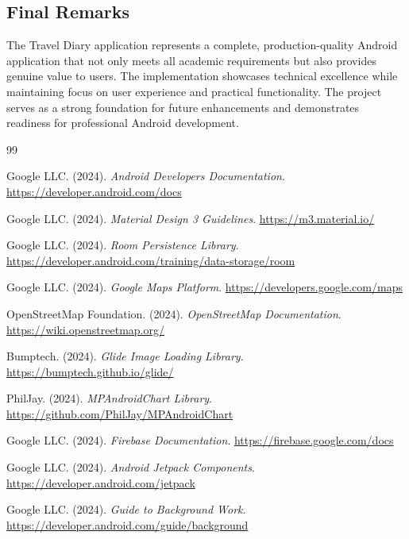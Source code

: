\documentclass[12pt,a4paper]{article}
\begin{document}
\subsection{Final Remarks}
The Travel Diary application represents a complete, production-quality Android application that not only meets all academic requirements but also provides genuine value to users. The implementation showcases technical excellence while maintaining focus on user experience and practical functionality. The project serves as a strong foundation for future enhancements and demonstrates readiness for professional Android development.

\newpage

\begin{thebibliography}{99}

Google LLC. (2024). \textit{Android Developers Documentation}.
\url{https://developer.android.com/docs}

Google LLC. (2024). \textit{Material Design 3 Guidelines}.
\url{https://m3.material.io/}

Google LLC. (2024). \textit{Room Persistence Library}.
\url{https://developer.android.com/training/data-storage/room}

Google LLC. (2024). \textit{Google Maps Platform}.
\url{https://developers.google.com/maps}

OpenStreetMap Foundation. (2024). \textit{OpenStreetMap Documentation}.
\url{https://wiki.openstreetmap.org/}

Bumptech. (2024). \textit{Glide Image Loading Library}.
\url{https://bumptech.github.io/glide/}

PhilJay. (2024). \textit{MPAndroidChart Library}.
\url{https://github.com/PhilJay/MPAndroidChart}

Google LLC. (2024). \textit{Firebase Documentation}.
\url{https://firebase.google.com/docs}

Google LLC. (2024). \textit{Android Jetpack Components}.
\url{https://developer.android.com/jetpack}

Google LLC. (2024). \textit{Guide to Background Work}.
\url{https://developer.android.com/guide/background}

\end{thebibliography}

\newpage
\end{document}
